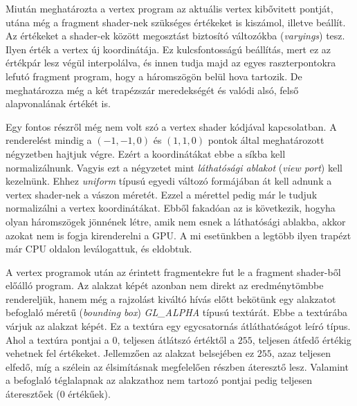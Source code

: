 \documentclass[12pt]{report}
\theoremstyle{definition}
\newcommand{\inenglish}[1]{\textsl{#1}}
\newcommand{\func}[1]{{\textsl{#1}}}
\begin{document}
Miután meghatározta a vertex program az aktuális vertex kibővitett pontját,
utána még a fragment shader-nek szükséges értékeket is kiszámol, illetve
beállít. Az értékeket a shader-ek között megosztást biztosító változókba
(\inenglish{varyings}) tesz. Ilyen érték a vertex új koordinátája. Ez
kulcsfontosságú beállítás, mert ez az értékpár lesz végül interpolálva, és
innen tudja majd az egyes raszterpontokra lefutó fragment program, hogy a
háromszögön belül hova tartozik. De meghatározza még a két trapézszár
meredekségét és valódi alsó, felső alapvonalának értékét is.

Egy fontos részről még nem volt szó a vertex shader kódjával kapcsolatban. A
renderelést mindig a $(-1, -1, 0)$ és $(1, 1, 0)$ pontok által meghatározott
négyzetben hajtjuk végre. Ezért a koordinátákat ebbe a síkba kell
normalizálnunk. Vagyis ezt a négyzetet mint \emph{láthatósági ablakot}
(\inenglish{view port}) kell kezelnünk. Ehhez \func{uniform} típusú egyedi
változó formájában át kell adnunk a vertex shader-nek a vászon méretét. Ezzel a
mérettel pedig már le tudjuk normalizálni a vertex koordinátákat. Ebből
fakadóan az is következik, hogyha olyan háromszögek jönnének létre, amik nem
esnek a láthatósági ablakba, akkor azokat nem is fogja kirenderelni a GPU. A mi
esetünkben a legtöbb ilyen trapézt már CPU oldalon leválogattuk, és eldobtuk.

A vertex programok után az érintett fragmentekre fut le a fragment shader-ből
előálló program. Az alakzat képét azonban nem direkt az eredménytömbbe
rendereljük, hanem még a rajzolást kiváltó hívás előtt bekötünk egy alakzatot
befoglaló méretű (\inenglish{bounding box}) \func{GL\_ALPHA} típusú textúrát.
Ebbe a textúrába várjuk az alakzat képét. Ez a textúra egy egycsatornás
átláthatóságot leíró típus. Ahol a textúra pontjai a $0$, teljesen átlátszó
értéktől a $255$, teljesen átfedő értékig vehetnek fel értékeket. Jellemzően az
alakzat belsejében ez $255$, azaz teljesen elfedő, míg a szélein az
élsimításnak megfelelően részben áteresztő lesz. Valamint a befoglaló
téglalapnak az alakzathoz nem tartozó pontjai pedig teljesen áteresztőek ($0$
értékűek).
\end{document}
